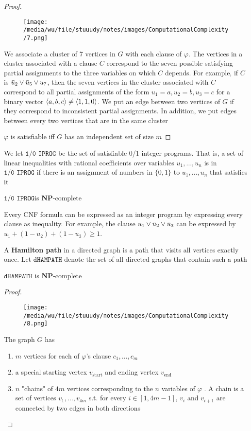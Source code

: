 \documentclass[11pt]{article}
\def \NP {\textbf{NP}}
\def \start {\text{start}}
\def \tend {\text{end}}
\def \NP {\textbf{NP}}
\def \ZOIPROG {\texttt{1/0 IPROG}}
\def \dHAMPATH {\texttt{dHAMPATH}}
\begin{document}
\begin{enumerate}
\begin{proof}
\begin{figure}[htbp]
\centering
\texttt{[image: /media/wu/file/stuuudy/notes/images/ComputationalComplexity/7.png]}
\end{figure}

We associate a cluster of 7 vertices in \(G\) with each clause of \(\varphi\). The vertices in a cluster
associated with a clause \(C\) correspond to the seven possible satisfying partial assignments
to the three variables on which \(C\) depends. For example, if \(C\)
is \(\bar{u}_2\vee\bar{u}_5\vee u_7\), then the seven vertices in the cluster associated with \(C\)
correspond to all partial assignments of the form \(u_1=a,u_2=b,u_3=c\) for a binary
vector \(\langle a,b,c\rangle\neq\langle1,1,0\rangle\). We put an edge between two vertices of \(G\) if they
correspond to inconsistent partial assignments. In addition, we put edges between every two
vertices that are in the same cluster

\(\varphi\) is satisfiable iff \(G\) has an independent set of size \(m\)
\end{proof}

We let \(\ZOIPROG\) be the set of satisfiable 0/1 integer programs.
That is, a set of linear inequalities with rational coefficients over
variables \(u_1,\dots,u_n\) is in \(\ZOIPROG\) if there is an assignment of numbers in \(\{0,1\}\)
to \(u_1,\dots,u_n\) that satisfies it

\begin{theorem}[]
\(\ZOIPROG\)is \(\NP\)-complete

Every CNF formula can be expressed as an integer program by expressing every clause as
inequality. For example, the clause \(u_1\vee\bar{u}_2\vee\bar{u}_3\) can be expressed by
\(u_1+(1-u_2)+(1-u_3)\ge1\).
\end{theorem}

A \textbf{Hamilton path} in a directed graph is a path that visits all vertices exactly once. Let
\(\dHAMPATH\) denote the set of all directed graphs that contain such a path
\begin{theorem}[]
\(\dHAMPATH\) is \(\NP\)-complete
\end{theorem}

\begin{proof}
\begin{figure}[htbp]
\centering
\texttt{[image: /media/wu/file/stuuudy/notes/images/ComputationalComplexity/8.png]}
\end{figure}

The graph \(G\) has
\begin{enumerate}
\item \(m\) vertices for each of \(\varphi\)'s clause \(c_1,\dots,c_m\)
\item a special starting vertex \(v_{\start}\) and ending vertex \(v_{\tend}\)
\item \(n\) "chains" of \(4m\) vertices corresponding to the \(n\) variables of \(\varphi\) . A chain is a
set of vertices \(v_1,\dots,v_{4m}\) s.t. for every \(i\in[1,4m-1]\), \(v_i\)
and \(v_{i+1}\) are connected by two edges in both directions
\end{enumerate}



\end{proof}
\end{enumerate}
\end{document}
